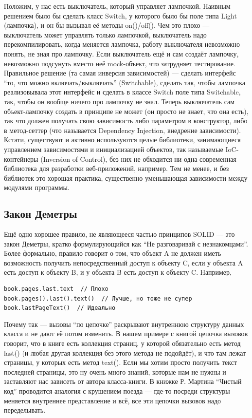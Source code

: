 \documentclass{../../text-style}
\begin{document}
\begin{itemize}
		Положим, у нас есть выключатель, который управляет лампочкой. Наивным решением было бы сделать класс Switch, у которого было бы поле типа Light (лампочка), и он бы вызывал её методы on()/off(). Чем это плохо --- выключатель может управлять только лампочкой, выключатель надо перекомпилировать, когда меняется лампочка, работу выключателя невозможно понять, не зная про лампочку. Если выключатель ещё и сам создаёт лампочку, невозможно подсунуть вместо неё mock-объект, что затрудняет тестирование. Правильное решение (та самая инверсия зависимостей) --- сделать интерфейс ``то, что можно включать/выключать'' (Switchable), сделать так, чтобы лампочка реализовывала этот интерфейс и сделать в классе Switch поле типа Switchable, так, чтобы он вообще ничего про лампочку не знал. Теперь выключатель сам объект-лампочку создать в принципе не может (он просто не знает, что она есть), так что должен получать свою зависимость либо параметром в конструктор, либо в метод-сеттер (что называется Dependency Injection, внедрение зависимости). Кстати, существуют и активно используются целые библиотеки, занимающиеся управлением зависимостями и инициализацией объектов, так называемые IoC-контейнеры (Inversion of Control), без них не обходится ни одна современная библиотека для разработки веб-приложений, например. Тем не менее, и без библиотек это хорошая практика, существенно уменьшающая зависимости между модулями программы.
\end{itemize}

\subsection{Закон Деметры}

Ещё одно хорошее правило, не являющееся частью принципов SOLID --- это закон Деметры, кратко формулирующийся как ``Не разговаривай с незнакомцами''. Более формально, правило говорит о том, что объект A не должен иметь возможность получить непосредственный доступ к объекту C, если у объекта A есть доступ к объекту B, и у объекта B есть доступ к объекту C. Например,

\begin{verbatim}
book.pages.last.text  // Плохо
book.pages().last().text()  // Лучше, но тоже не супер
book.lastPageText()  // Идеально
\end{verbatim}

Почему так --- вызовы ``по цепочке'' раскрывают внутреннюю структуру данных класса и не дают её потом изменить. В нашем примере с книгой цепочка вызовов говорит, что в книге есть коллекция страниц, у которой обязательно есть метод last() (и любая другая коллекция без этого метода не подойдёт), и что там лежат страницы, у которых есть метод text(). Если мы хотим просто получить текст последней страницы, это ну очень много знаний, которые нам не нужны и заставляют нас зависеть от автора класса-книги. В книжке Р. Мартина ``Чистый код'' проводится аналогия с крушением поезда --- где-то посреди структуры меняется внутреннее представление и всё, все эти цепочки вызовов надо переделывать.
\end{document}
